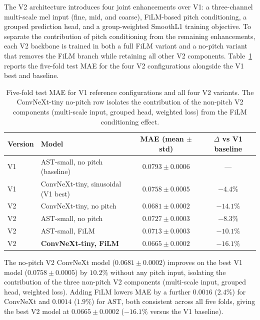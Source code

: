 \noindent \newline
The V2 architecture introduces four joint enhancements over V1: a three-channel multi-scale mel input (fine, mid, and coarse), FiLM-based pitch conditioning, a grouped prediction head, and a group-weighted SmoothL1 training objective. To separate the contribution of pitch conditioning from the remaining enhancements, each V2 backbone is trained in both a full FiLM variant and a no-pitch variant that removes the FiLM branch while retaining all other V2 components. Table~\ref{tab:v2_results} reports the five-fold test MAE for the four V2 configurations alongside the V1 best and baseline.

\begin{table}[H]
\centering
\renewcommand{\arraystretch}{1.3}
\begin{tabular}{llcc}
\hline
\textbf{Version} & \textbf{Model} & \textbf{MAE (mean $\pm$ std)} & \textbf{$\Delta$ vs V1 baseline} \\
\hline
V1 & AST-small, no pitch (baseline) & $0.0793 \pm 0.0006$ & --- \\
V1 & ConvNeXt-tiny, sinusoidal (V1 best) & $0.0758 \pm 0.0005$ & $-4.4\%$ \\
\hline
V2 & ConvNeXt-tiny, no pitch & $0.0681 \pm 0.0002$ & $-14.1\%$ \\
V2 & AST-small, no pitch & $0.0727 \pm 0.0003$ & $-8.3\%$ \\
V2 & AST-small, FiLM & $0.0713 \pm 0.0003$ & $-10.1\%$ \\
V2 & \textbf{ConvNeXt-tiny, FiLM} & $\mathbf{0.0665 \pm 0.0002}$ & $\mathbf{-16.1\%}$ \\
\hline
\end{tabular}
\vspace{0.3cm}
\caption{Five-fold test MAE for V1 reference configurations and all four V2 variants. The ConvNeXt-tiny no-pitch row isolates the contribution of the non-pitch V2 components (multi-scale input, grouped head, weighted loss) from the FiLM conditioning effect.}
\label{tab:v2_results}
\end{table}

\noindent
The no-pitch V2 ConvNeXt model ($0.0681 \pm 0.0002$) improves on the best V1 model ($0.0758 \pm 0.0005$) by $10.2\%$ without any pitch input, isolating the contribution of the three non-pitch V2 components (multi-scale input, grouped head, weighted loss). Adding FiLM lowers MAE by a further $0.0016$ ($2.4\%$) for ConvNeXt and $0.0014$ ($1.9\%$) for AST, both consistent across all five folds, giving the best V2 model at $0.0665 \pm 0.0002$ ($-16.1\%$ versus the V1 baseline).

